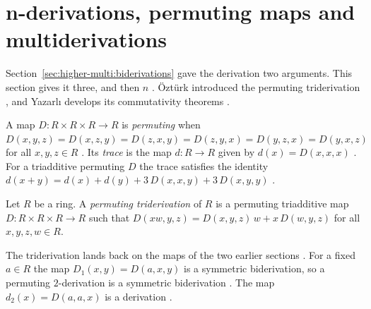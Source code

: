 \section{n-derivations, permuting maps and multiderivations}\label{sec:higher-multi:n-derivations}

Section~\ref{sec:higher-multi:biderivations} gave the derivation two
arguments. This section gives it three, and then $n$
\cite[p.~490]{Yazarli2017Trideriv}. Öztürk introduced the permuting
triderivation \cite[reference~10]{Ozturk1999Trideriv}, and Yazarlı develops
its commutativity theorems \cite[p.~489]{Yazarli2017Trideriv}.

A map $D\colon R\times R\times R\to R$ is \emph{permuting} when
$D(x,y,z)=D(x,z,y)=D(z,x,y)=D(z,y,x)=D(y,z,x)=D(y,x,z)$ for all $x,y,z\in R$
\cite[p.~490]{Yazarli2017Trideriv}. Its \emph{trace} is the map $d\colon
R\to R$ given by $d(x)=D(x,x,x)$ \cite[p.~490]{Yazarli2017Trideriv}. For a
triadditive permuting $D$ the trace satisfies the identity $d(x+y) =
d(x)+d(y)+3\,D(x,x,y)+3\,D(x,y,y)$ \cite[p.~490]{Yazarli2017Trideriv}.

\begin{definition}\label{def:higher:trideriv}
Let $R$ be a ring. A \emph{permuting triderivation} of $R$ is a permuting
triadditive map $D\colon R\times R\times R\to R$ such that
$D(xw,y,z)=D(x,y,z)\,w+x\,D(w,y,z)$ for all $x,y,z,w\in R$.
\end{definition}

The triderivation lands back on the maps of the two earlier sections
\cite[p.~490]{Yazarli2017Trideriv}. For a fixed $a\in R$ the map
$D_1(x,y)=D(a,x,y)$ is a symmetric biderivation, so a permuting
$2$-derivation is a symmetric biderivation
\cite[p.~490]{Yazarli2017Trideriv}. The map $d_2(x)=D(a,a,x)$ is a
derivation \cite[p.~490]{Yazarli2017Trideriv}.

